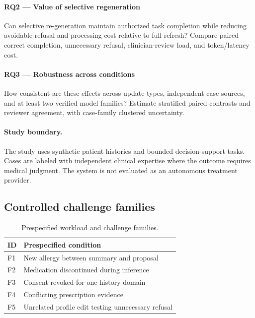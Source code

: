 \documentclass[11pt,a4paper]{article}
\begin{document}
\paragraph{RQ2 — Value of selective regeneration} Can selective re-generation maintain authorized task completion while reducing avoidable refusal and processing cost relative to full refresh? Compare paired correct completion, unnecessary refusal, clinician-review load, and token/latency cost.

\paragraph{RQ3 — Robustness across conditions} How consistent are these effects across update types, independent case sources, and at least two verified model families? Estimate stratified paired contrasts and reviewer agreement, with case-family clustered uncertainty.

\paragraph{Study boundary.} The study uses synthetic patient histories and bounded decision-support tasks. Cases are labeled with independent clinical expertise where the outcome requires medical judgment. The system is not evaluated as an autonomous treatment provider.

\subsection{Controlled challenge families}
\begin{table}[ht]
\centering\small
\caption{Prespecified workload and challenge families.}
\begin{tabularx}{\linewidth}{@{}lX@{}}\toprule
ID & Prespecified condition \\ \midrule
F1 & New allergy between summary and proposal \\ 
F2 & Medication discontinued during inference \\ 
F3 & Consent revoked for one history domain \\ 
F4 & Conflicting prescription evidence \\ 
F5 & Unrelated profile edit testing unnecessary refusal \\ 
\bottomrule\end{tabularx}\end{table}
\end{document}
